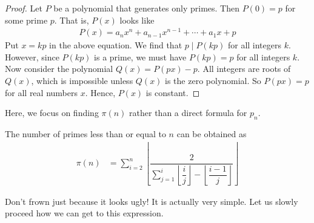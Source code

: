 \documentclass{subfiles}
\begin{document}
			\begin{proof}
				Let $P$ be a polynomial that generates only primes. Then $P(0)=p$ for some prime $p$. That is, $P(x)$ looks like
					\begin{align*}
					P(x)=a_nx^n+a_{n-1}x^{n-1} + \cdots + a_1x + p
					\end{align*}
				Put $x=kp$ in the above equation. We find that $p\mid P(kp)$ for all integers $k$. However, since $P(kp)$ is a prime, we must have $P(kp)=p$ for all integers $k$. Now consider the polynomial $Q(x)=P(px)-p$. All integers are roots of $Q(x)$, which is impossible unless $Q(x)$ is the zero polynomial. So $P(px)=p$ for all real numbers $x$. Hence, $P(x)$ is constant.
			\end{proof}
		Here, we focus on finding $\pi(n)$ rather than a direct formula for $p_n$.
			\begin{theorem}[]
				The number of primes less than or equal to $n$ can be obtained as
					\begin{align*}
						\pi(n) & =
							\sum_{i=2}^{n}\left\lfloor\dfrac{2}{\sum_{j=1}^{i}\left\lfloor\dfrac{i}{j}\right\rfloor-\left\lfloor\dfrac{i-1}{j}\right\rfloor}\right\rfloor
					\end{align*}
			\end{theorem}
		Don't frown just because it looks ugly! It is actually very simple. Let us slowly proceed how we can get to this expression.
\end{document}
